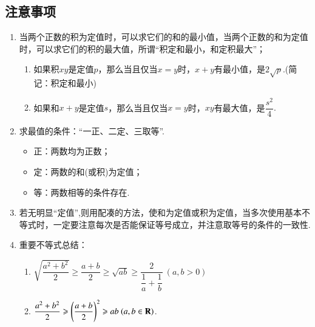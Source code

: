 \documentclass{BHCexam}
\begin{document}
\subsection{注意事项}
{\kaishu  \begin{enumerate}[1)] 
\item 当两个正数的积为定值时，可以求它们的和的最小值，当两个正数的和为定值时，可以求它们的积的最大值，所谓“积定和最小，和定积最大”；
\begin{enumerate}[(1)]
\item 如果积$ xy $是定值$ p $，那么当且仅当$x=y  $时，$ x+y $有最小值，是$ 2\sqrt{p} .$(简记：积定和最小)
\item 如果和$ x+y $是定值$ s $，那么当且仅当$ x=y $时，$ xy $有最大值，是$ \dfrac{s^2}{4}. $
\end{enumerate}
\item 求最值的条件：“一正、二定、三取等”.
\begin{itemize}
\item 正：两数均为正数；
\item 定：两数的和(或积)为定值；
\item 等：两数相等的条件存在.
\end{itemize}
\item 若无明显“定值”,则用配凑的方法，使和为定值或积为定值，当多次使用基本不等式时，一定要注意每次是否能保证等号成立，并注意取等号的条件的一致性.
\item 重要不等式总结：\begin{enumerate}[(1)]
\item $ \sqrt{\dfrac{a^2+b^2}{2}}\ge \dfrac{a+b}{2}\ge \sqrt{ab}\ge \dfrac{2}{\dfrac{1}{a}+\dfrac{1}{b}}~(a,b>0) $
\item $\dfrac{a^2+b^2}{2}\geqslant \left(\dfrac{a+b}{2}\right)^2\geqslant ab ~(a,b\in\mathbf{R})$.
\end{enumerate}

\end{enumerate}
}
\end{document}
